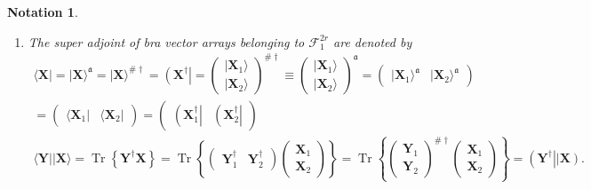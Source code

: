 \documentclass[aps, preprint]{revtex4}
\newtheorem{notation}[theorem]{Notation}
\begin{document}
\begin{notation}
\begin{enumerate}
\item The \emph{super} \emph{adjoint}
of bra vector arrays belonging to $\mathcal{F}_{1}^{2 r}$ are denoted by
\begin{gather} \langle \mathbf{X}\vert  =\vert \mathbf{X} \rangle ^{\mathfrak{a}} =\vert \mathbf{X} \rangle ^{\# \dag } =\left (\mathbf{X}^{ \dag }\right \vert  =\left (\begin{array}{c}\vert \mathbf{X}_{1} \rangle  \\
\vert \mathbf{X}_{2} \rangle \end{array}\right )^{\# \dag } \equiv \left (\begin{array}{c}\vert \mathbf{X}_{1} \rangle  \\
\vert \mathbf{X}_{2} \rangle \end{array}\right )^{\mathfrak{a}} =\left (\begin{array}{cc}\vert \mathbf{X}_{1} \rangle ^{\mathfrak{a}} & \vert \mathbf{X}_{2} \rangle ^{\mathfrak{a}}\end{array}\right ) \\
 =\left (\begin{array}{cc} \langle \mathbf{X}_{1}\vert  &  \langle \mathbf{X}_{2}\vert \end{array}\right ) =\left (\begin{array}{cc}\left (\mathbf{X}_{1}^{ \dag }\right \vert  & \left (\mathbf{X}_{2}^{ \dag }\right \vert \end{array}\right ) \\
 \langle \mathbf{Y}\vert \vert \mathbf{X} \rangle  =\ensuremath{\operatorname*{Tr}} \left \{\mathbf{Y}^{ \dag } \mathbf{X}\right \} =\ensuremath{\operatorname*{Tr}} \left \{\left (\begin{array}{cc}\mathbf{Y}_{1}^{ \dag } & \mathbf{Y}_{2}^{ \dag }\end{array}\right ) \left (\begin{array}{c}\mathbf{X}_{1} \\
\mathbf{X}_{2}\end{array}\right )\right \} =\ensuremath{\operatorname*{Tr}} \left \{\left (\begin{array}{c}\mathbf{Y}_{1} \\
\mathbf{Y}_{2}\end{array}\right )^{\# \dag } \left (\begin{array}{c}\mathbf{X}_{1} \\
\mathbf{X}_{2}\end{array}\right )\right \} =\left (\mathbf{Y}^{ \dag }\right \vert \left \vert \mathbf{X}\right )\text{.}\end{gather}\end{enumerate}
\end{notation}
\end{document}
